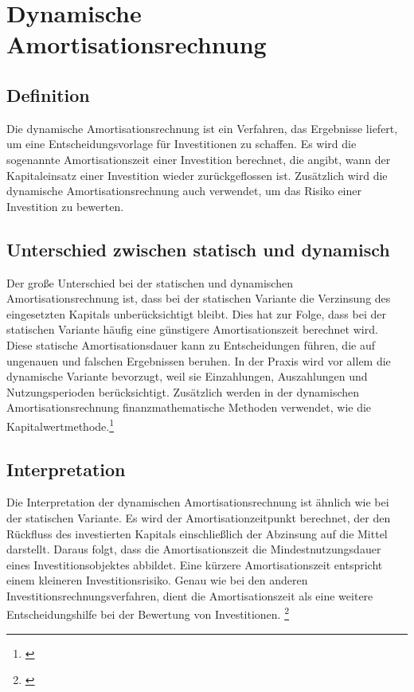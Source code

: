 \chapter{Dynamische Amortisationsrechnung}
\label{Dynamische Amortisationsrechnung}

\section{Definition}
Die dynamische Amortisationsrechnung ist ein Verfahren, das Ergebnisse liefert, um eine Entscheidungsvorlage für Investitionen zu schaffen. Es wird die sogenannte Amortisationszeit einer Investition berechnet, die angibt, wann der Kapitaleinsatz einer Investition wieder zurückgeflossen ist. Zusätzlich wird die dynamische Amortisationsrechnung auch verwendet, um das Risiko einer Investition zu bewerten.

\section{Unterschied zwischen statisch und dynamisch}
Der große Unterschied bei der statischen und dynamischen Amortisationsrechnung ist, dass bei der statischen Variante die Verzinsung des eingesetzten Kapitals unberücksichtigt bleibt. Dies hat zur Folge, dass bei der statischen Variante häufig eine günstigere Amortisationszeit berechnet wird. Diese statische Amortisationsdauer kann zu Entscheidungen führen, die auf ungenauen und falschen Ergebnissen beruhen. In der Praxis wird vor allem die dynamische Variante bevorzugt, weil sie Einzahlungen, Auszahlungen und Nutzungsperioden berücksichtigt. Zusätzlich werden in der dynamischen Amortisationsrechnung finanzmathematische Methoden verwendet, wie die Kapitalwertmethode.\footnote{\cite{gevestor}}
\newpage
\section{Interpretation}
Die Interpretation der dynamischen Amortisationsrechnung ist ähnlich wie bei der statischen Variante. Es wird der Amortisationzeitpunkt
berechnet, der den Rückfluss des investierten Kapitals einschließlich der Abzinsung auf die Mittel darstellt. Daraus folgt, dass die Amortisationszeit die Mindestnutzungsdauer eines Investitionsobjektes abbildet. Eine kürzere Amortisationszeit entspricht einem kleineren Investitionsrisiko. Genau wie bei den anderen Investitionsrechnungsverfahren, dient die Amortisationszeit als eine weitere Entscheidungshilfe bei der Bewertung von Investitionen.
\footnote{\cite{gevestor}}
